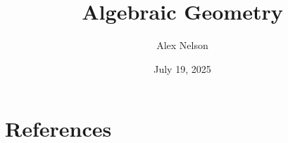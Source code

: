\documentclass{book}
\title{Algebraic Geometry}
\author{Alex Nelson}
\date{July 19, 2025}
\begin{document}
\frontmatter
\maketitle



\tableofcontents

\mainmatter























\chapter*{References}


\end{document}
